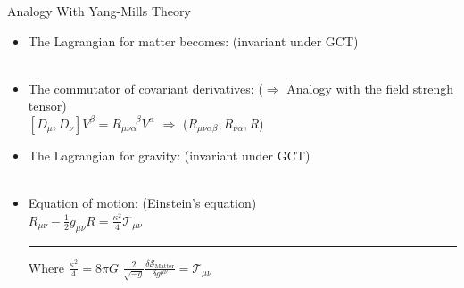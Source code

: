 \documentclass[aspectratio=169,usenames,dvipsnames]{beamer}
\begin{document}
\begin{frame}{Analogy With Yang-Mills Theory} 
  \begin{itemize}
    \item[] The Lagrangian for matter becomes: \scriptsize{(invariant under GCT)} \normalsize \\[1mm]
    \centering {}  \\[6mm]
   \raggedright\item[] The commutator of covariant derivatives: \scriptsize{($\Rightarrow$
   Analogy with the field strengh tensor)} \normalsize \\[1mm]
   \centering $[D_{\mu},D_{\nu}] V^{\beta} =R_{\mu\nu\alpha}^{\;\;\;\;\;\;\beta}
   V^{\alpha} $ \qquad $\Rightarrow$ \qquad ($R_{\mu\nu\alpha\beta},
   R_{\nu\alpha},R$) \\[6mm]
   \raggedright\item[] The Lagrangian for gravity: \scriptsize{(invariant under
     GCT)} \normalsize \\[1mm]
   \centering {}  \\[6mm]
   \raggedright\item[] Equation of motion: \scriptsize{(Einstein’s equation)} \normalsize \\[1mm]
   \centering $R_{\mu\nu} - \frac{1}{2} g_{\mu\nu} R = \frac{\kappa^2}{4}
   \mathcal{T}_{\mu\nu}$\\[1mm]
   \textcolor{LUCopper}{\rule{\textwidth}{1pt}}
   \raggedright\tiny{Where $\frac{\kappa^2}{4} = 8 \pi G$ \hfill $
   \frac{2}{\sqrt{-g}} \frac{\delta \mathcal{S}_{\text{Matter}}}{\delta g^{\mu\nu}} = \mathcal{T}_{\mu\nu} $ }  \\[8mm]
 \end{itemize}
\end{frame}
\end{document}
